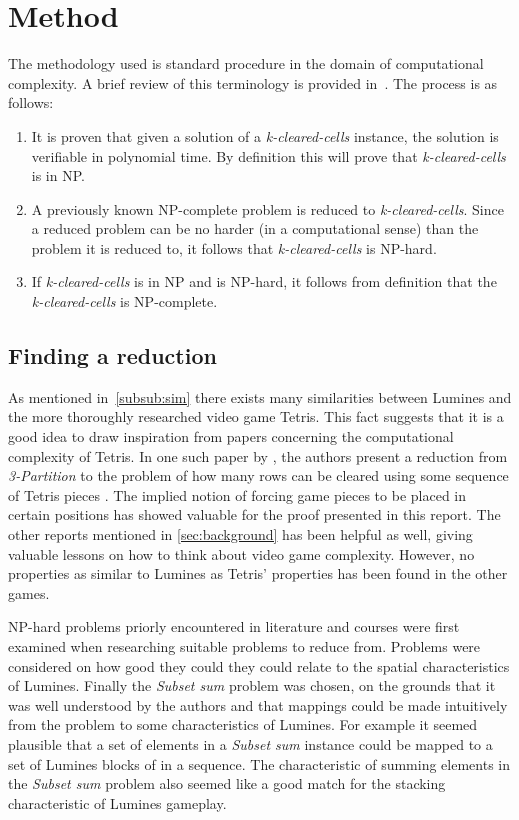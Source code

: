 \section{Method}
\label{method}

The methodology used is standard procedure in the domain of computational complexity. A brief review of this terminology is provided in~.
The process is as follows:

\begin{enumerate}
    \item It is proven that given a solution of a \textit{k-cleared-cells} instance, the solution is verifiable in polynomial time. By definition this will prove that \textit{k-cleared-cells} is in NP.
    \item A previously known NP-complete problem is reduced to \textit{k-cleared-cells}. Since a reduced problem can be no harder (in a computational sense) than the problem it is reduced to, it follows that \textit{k-cleared-cells} is NP-hard.
    \item If \textit{k-cleared-cells} is in NP and is NP-hard, it follows from definition that the \textit{k-cleared-cells} is NP-complete.
\end{enumerate}

\subsection{Finding a reduction}
As mentioned in~\autoref{subsub:sim} there exists many similarities between Lumines and the more thoroughly researched video game Tetris. This fact suggests that it is a good idea to draw inspiration from papers concerning the computational complexity of Tetris. In one such paper by \citeauthor{tetris}, the authors present a reduction from \textit{3-Partition} to the problem of how many rows can be cleared using some sequence of Tetris pieces \cite{tetris}. The implied notion of forcing game pieces to be placed in certain positions has showed valuable for the proof presented in this report. The other reports mentioned in \autoref{sec:background} has been helpful as well, giving valuable lessons on how to think about video game complexity. However, no properties as similar to Lumines as Tetris' properties has been found in the other games.

NP-hard problems priorly encountered in literature and courses were first examined when researching suitable problems to reduce from. Problems were considered on how good they could they could relate to the spatial characteristics of Lumines. Finally the \textit{Subset sum} problem was chosen, on the grounds that it was well understood by the authors and that mappings could be made intuitively from the problem to some characteristics of Lumines. For example it seemed plausible that a set of elements in a \textit{Subset sum} instance could be mapped to a set of Lumines blocks of in a sequence. The characteristic of summing elements in the \textit{Subset sum} problem also seemed like a good match for the stacking characteristic of Lumines gameplay.
